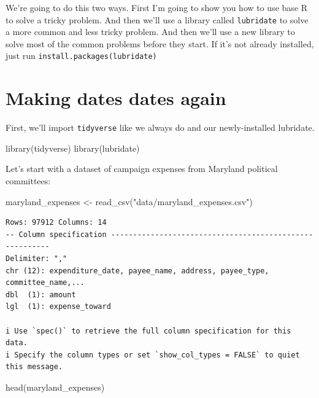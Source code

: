 \documentclass[
  letterpaper,
  DIV=11,
  numbers=noendperiod]{scrreprt}
\newenvironment{Shaded}{\begin{snugshade}}{\end{snugshade}}
\newcommand{\FunctionTok}[1]{\textcolor[rgb]{0.28,0.35,0.67}{#1}}
\newcommand{\NormalTok}[1]{\textcolor[rgb]{0.00,0.23,0.31}{#1}}
\newcommand{\OtherTok}[1]{\textcolor[rgb]{0.00,0.23,0.31}{#1}}
\newcommand{\StringTok}[1]{\textcolor[rgb]{0.13,0.47,0.30}{#1}}
\begin{document}
We're going to do this two ways. First I'm going to show you how to use
base R to solve a tricky problem. And then we'll use a library called
\texttt{lubridate} to solve a more common and less tricky problem. And
then we'll use a new library to solve most of the common problems before
they start. If it's not already installed, just run
\texttt{install.packages(\textquotesingle{}lubridate\textquotesingle{})}

\hypertarget{making-dates-dates-again}{%
\section{Making dates dates again}\label{making-dates-dates-again}}

First, we'll import \texttt{tidyverse} like we always do and our
newly-installed lubridate.

\begin{Shaded}
\begin{Highlighting}[]
\FunctionTok{library}\NormalTok{(tidyverse)}
\FunctionTok{library}\NormalTok{(lubridate)}
\end{Highlighting}
\end{Shaded}

Let's start with a dataset of campaign expenses from Maryland political
committees:

\begin{Shaded}
\begin{Highlighting}[]
\NormalTok{maryland\_expenses }\OtherTok{\textless{}{-}} \FunctionTok{read\_csv}\NormalTok{(}\StringTok{"data/maryland\_expenses.csv"}\NormalTok{)}
\end{Highlighting}
\end{Shaded}

\begin{verbatim}
Rows: 97912 Columns: 14
-- Column specification --------------------------------------------------------
Delimiter: ","
chr (12): expenditure_date, payee_name, address, payee_type, committee_name,...
dbl  (1): amount
lgl  (1): expense_toward

i Use `spec()` to retrieve the full column specification for this data.
i Specify the column types or set `show_col_types = FALSE` to quiet this message.
\end{verbatim}

\begin{Shaded}
\begin{Highlighting}[]
\FunctionTok{head}\NormalTok{(maryland\_expenses)}
\end{Highlighting}
\end{Shaded}
\end{document}
